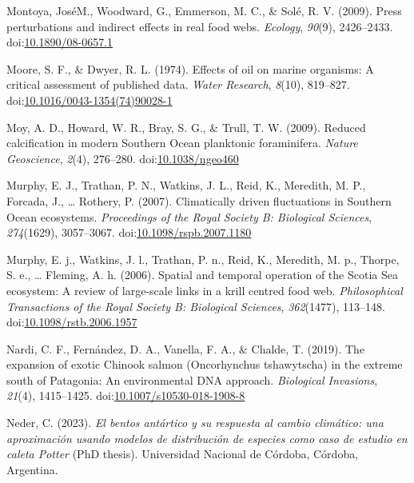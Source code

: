 \documentclass[
]{article}
\newlength{\cslhangindent}
\newlength{\cslentryspacingunit} %
\newenvironment{CSLReferences}[2] %
 {%
  \setlength{\parindent}{0pt}
  \ifodd #1
  \let\oldpar\par
  \def\par{\hangindent=\cslhangindent\oldpar}
  \fi
  \setlength{\parskip}{#2\cslentryspacingunit}
 }%
 {}
\begin{document}
\begin{CSLReferences}{1}{0}
\leavevmode{}%
Montoya, JoséM., Woodward, G., Emmerson, M. C., \& Solé, R. V. (2009).
Press perturbations and indirect effects in real food webs.
\emph{Ecology}, \emph{90}(9), 2426--2433.
doi:\href{https://doi.org/10.1890/08-0657.1}{10.1890/08-0657.1}

\leavevmode{}%
Moore, S. F., \& Dwyer, R. L. (1974). Effects of oil on marine
organisms: {A} critical assessment of published data. \emph{Water
Research}, \emph{8}(10), 819--827.
doi:\href{https://doi.org/10.1016/0043-1354(74)90028-1}{10.1016/0043-1354(74)90028-1}

\leavevmode{}%
Moy, A. D., Howard, W. R., Bray, S. G., \& Trull, T. W. (2009). Reduced
calcification in modern {Southern Ocean} planktonic foraminifera.
\emph{Nature Geoscience}, \emph{2}(4), 276--280.
doi:\href{https://doi.org/10.1038/ngeo460}{10.1038/ngeo460}

\leavevmode{}%
Murphy, E. J., Trathan, P. N., Watkins, J. L., Reid, K., Meredith, M.
P., Forcada, J., \ldots{} Rothery, P. (2007). Climatically driven
fluctuations in {Southern Ocean} ecosystems. \emph{Proceedings of the
Royal Society B: Biological Sciences}, \emph{274}(1629), 3057--3067.
doi:\href{https://doi.org/10.1098/rspb.2007.1180}{10.1098/rspb.2007.1180}

\leavevmode{}%
Murphy, E. j., Watkins, J. l., Trathan, P. n., Reid, K., Meredith, M.
p., Thorpe, S. e., \ldots{} Fleming, A. h. (2006). Spatial and temporal
operation of the {Scotia Sea} ecosystem: A review of large-scale links
in a krill centred food web. \emph{Philosophical Transactions of the
Royal Society B: Biological Sciences}, \emph{362}(1477), 113--148.
doi:\href{https://doi.org/10.1098/rstb.2006.1957}{10.1098/rstb.2006.1957}

\leavevmode{}%
Nardi, C. F., Fernández, D. A., Vanella, F. A., \& Chalde, T. (2019).
The expansion of exotic {Chinook} salmon ({Oncorhynchus} tshawytscha) in
the extreme south of {Patagonia}: An environmental {DNA} approach.
\emph{Biological Invasions}, \emph{21}(4), 1415--1425.
doi:\href{https://doi.org/10.1007/s10530-018-1908-8}{10.1007/s10530-018-1908-8}

\leavevmode{}%
Neder, C. (2023). \emph{{El bentos antártico y su respuesta al cambio
climático: una aproximación usando modelos de distribución de especies
como caso de estudio en caleta Potter}} (PhD thesis). Universidad
Nacional de Córdoba, {Córdoba, Argentina}.


\end{CSLReferences}
\end{document}
